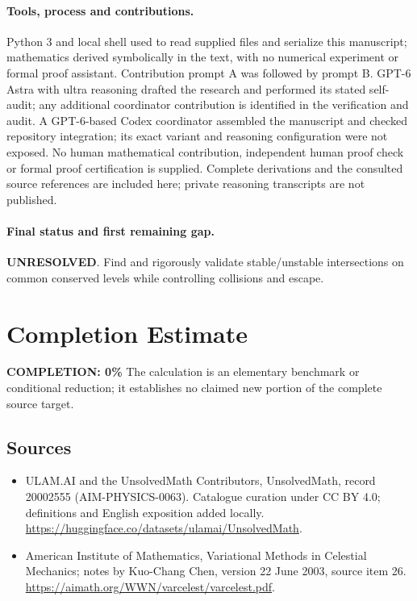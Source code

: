 \documentclass[11pt]{article}
\begin{document}
\paragraph{Tools, process and contributions.}
Python 3 and local shell used to read supplied files and serialize this manuscript; mathematics derived symbolically in the text, with no numerical experiment or formal proof assistant. Contribution prompt A was followed by prompt B. GPT-6 Astra with ultra reasoning drafted the research and performed its stated self-audit; any additional coordinator contribution is identified in the verification and audit. A GPT-6-based Codex coordinator assembled the manuscript and checked repository integration; its exact variant and reasoning configuration were not exposed. No human mathematical contribution, independent human proof check or formal proof certification is supplied. Complete derivations and the consulted source references are included here; private reasoning transcripts are not published.

\paragraph{Final status and first remaining gap.}
\textbf{UNRESOLVED}. Find and rigorously validate stable/unstable intersections on common conserved levels while controlling collisions and escape.

\section{Completion Estimate}
\noindent\textbf{COMPLETION: 0\%}
The calculation is an elementary benchmark or conditional reduction; it establishes no claimed new portion of the complete source target.

\subsection{Sources}
\begin{itemize}
\item[\hypertarget{source:20002555:1}{S1}] ULAM.AI and the UnsolvedMath Contributors, UnsolvedMath, record 20002555 (AIM-PHYSICS-0063). Catalogue curation under CC BY 4.0; definitions and English exposition added locally.
\url{https://huggingface.co/datasets/ulamai/UnsolvedMath}.
\item[\hypertarget{source:20002555:2}{S2}] American Institute of Mathematics, Variational Methods in Celestial Mechanics; notes by Kuo-Chang Chen, version 22 June 2003, source item 26.
\url{https://aimath.org/WWN/varcelest/varcelest.pdf}.
\end{itemize}
\label{end:20002555}
\end{document}
